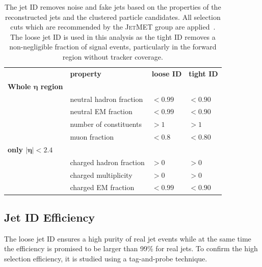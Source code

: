 \begin{table}[htbp]
    \centering
    \caption[Jet ID criteria]{The jet ID removes noise and fake jets based on
        the properties of the reconstructed jets and the clustered particle
        candidates. All selection cuts which are recommended by the
        \textsc{JetMET} group are applied~\cite{jetmet:jetid}. The loose jet ID is
        used in this analysis as the tight ID removes a non-negligible fraction
        of signal events, particularly in the forward region without tracker
        coverage.}
    \label{tab:jetid}
    \begin{tabular}{llll}
    \toprule
                                 & \textbf{property}       & \textbf{loose ID} & \textbf{tight ID}\\\cmidrule(lr){2-4}
                                 \textbf{Whole $\bm{\eta}$ region} &                         &                   & \\\cmidrule(lr){1-1}
                                 & neutral hadron fraction & $< 0.99$          & $< 0.90$\\
                                 & neutral EM fraction     & $< 0.99$          & $< 0.90$\\
                                 & number of constituents  & $> 1$             & $> 1$\\
                                 & muon fraction           & $< 0.8$           & $< 0.80$\\
                                 \textbf{only $\bm{|\eta| < 2.4}$} &                         &                   & \\\cmidrule(lr){1-1}
                                 & charged hadron fraction & $> 0$             & $> 0$\\
                                 & charged multiplicity    & $> 0$             & $> 0$\\
                                 & charged EM fraction     & $< 0.99$          & $< 0.90$\\
    \bottomrule
    \end{tabular}
\end{table}


\subsection{Jet ID Efficiency}

The loose jet ID ensures a high purity of real jet events while at the same time
the efficiency is promised to be larger than 99\% for real jets. To confirm the
high selection efficiency, it is studied using a tag-and-probe technique.

